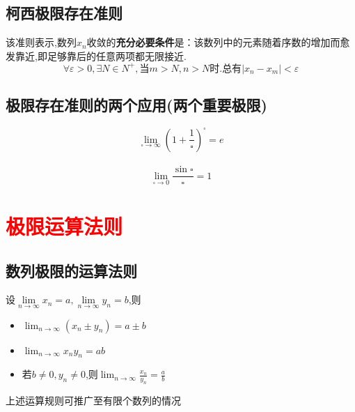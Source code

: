 \documentclass[12pt, a4paper, oneside, UTF8]{ctexbook}  %
\begin{document}
\begin{sloppypar}
    \subsection{柯西极限存在准则}
    该准则表示,数列${x_n}$收敛的\textbf{充分必要条件}是：该数列中的元素随着序数的增加而愈发靠近,即足够靠后的任意两项都无限接近.
    $$
        \forall \varepsilon >0 ,\exists N \in N^+,\text{当}m>N,n>N\text{时}.\text{总有}|x_n-x_m|<\varepsilon
    $$
    \subsection{极限存在准则的两个应用(两个重要极限)}
    $$
        \lim _ { \square \rightarrow \infty } ( 1 + \frac { 1 } { \square } ) ^ { \square } = e
    $$
    \\
    $$
        \lim _ { \square \rightarrow 0 } \frac { \sin \square } { \square } = 1
    $$
    \section{\textcolor{red}{极限运算法则}}

    \subsection{数列极限的运算法则}
    设$\underset{n\to\infty}{\operatorname*{lim}}x_{n}=a,\underset{n\to\infty}{\operatorname*{lim}}y_{n}=b$,则
    \begin{itemize}
        \item $\operatorname*{lim}_{n\to\infty}(x_n\pm y_n)=a\pm b$
        \item $\lim_{n\to\infty}x_{n}y_{n}=ab$
        \item 若$b \neq 0,y_n \neq 0$,则$\lim_{n\to\infty}\frac{x_n}{y_n}=\frac{a}{b}$
    \end{itemize}
    上述运算规则可推广至有限个数列的情况

\end{sloppypar}
\end{document}
